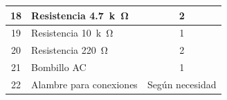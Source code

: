 \documentclass[12pt]{article}
\begin{document}
\begin{table}[H]
{\begin{tabular}{c p{11cm} c}
    \midrule
    18 & Resistencia \SI{4.7}{k\ohm} & 2 \\

    \midrule
    19 & Resistencia \SI{10}{k\ohm} & 1 \\

    \midrule
    20 & Resistencia \SI{220}{\ohm} & 2 \\

    \midrule
    21 & Bombillo AC & 1 \\

    \midrule
    22 & Alambre para conexiones & Según necesidad \\

    \midrule

    \bottomrule
    \end{tabular}
    }

    \label{tElementos}

\end{table}
\end{document}
